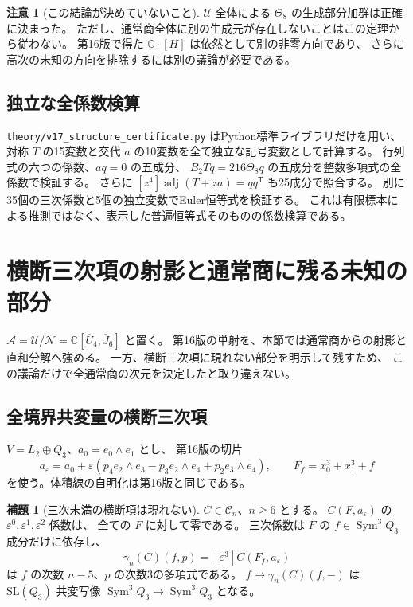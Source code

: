 \documentclass[a4paper,11pt]{ltjsarticle}
\theoremstyle{definition}
\newtheorem{lemma}[theorem]{補題}
\newtheorem{remark}[theorem]{注意}
\begin{document}
\begin{remark}[この結論が決めていないこと]
$\mathcal U$ 全体による $\Theta_8$ の生成部分加群は正確に決まった。
ただし、通常商全体に別の生成元が存在しないことはこの定理から従わない。
第16版で得た $\mathbb C\cdot[H]$ は依然として別の非零方向であり、
さらに高次の未知の方向を排除するには別の議論が必要である。
\end{remark}

\subsection{独立な全係数検算}

\nolinkurl{theory/v17_structure_certificate.py} はPython標準ライブラリだけを用い、
対称 $T$ の15変数と交代 $a$ の10変数を全て独立な記号変数として計算する。
行列式の六つの係数、$aq=0$ の五成分、
$B_2Tq=216\Theta_8q$ の五成分を整数多項式の全係数で検証する。
さらに $[z^4]\operatorname{adj}(T+za)=qq^{\mathsf T}$ も25成分で照合する。
別に35個の三次係数と5個の独立変数でEuler恒等式を検証する。
これは有限標本による推測ではなく、表示した普遍恒等式そのものの係数検算である。




\section{横断三次項の射影と通常商に残る未知の部分}
\label{sec:v17-normal-projection}

$\mathcal A=\mathcal U/\mathcal N
=\mathbb C[\overline U_4,\overline J_6]$ と置く。
第16版の単射を、本節では通常商からの射影と直和分解へ強める。
一方、横断三次項に現れない部分を明示して残すため、
この議論だけで全通常商の次元を決定したと取り違えない。

\subsection{全境界共変量の横断三次項}

$V=L_2\oplus Q_3$、$a_0=e_0\wedge e_1$ とし、
第16版の切片
\[
 a_\varepsilon=a_0+
 \varepsilon(p_4e_2\wedge e_3-p_3e_2\wedge e_4+p_2e_3\wedge e_4),
 \qquad F_f=x_0^3+x_1^3+f
\]
を使う。体積線の自明化は第16版と同じである。

\begin{lemma}[三次未満の横断項は現れない]
\label{lem:v17-covariant-normal-order}
$C\in\mathcal C_n$、$n\ge6$ とする。
$C(F,a_\varepsilon)$ の $\varepsilon^0,\varepsilon^1,\varepsilon^2$ 係数は、
全ての $F$ に対して零である。
三次係数は $F$ の $f\in\operatorname{Sym}^3Q_3$ 成分だけに依存し、
\[
 \gamma_n(C)(f,p)
 =[\varepsilon^3]C(F_f,a_\varepsilon)
\]
は $f$ の次数 $n-5$、$p$ の次数3の多項式である。
$f\mapsto\gamma_n(C)(f,-)$ は $\mathrm{SL}(Q_3)$ 共変写像
$\operatorname{Sym}^3Q_3\to\operatorname{Sym}^3Q_3$ となる。
\end{lemma}
\end{document}
